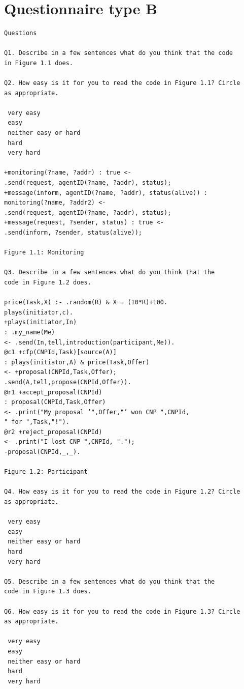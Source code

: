 \documentclass[a4paper,12pt,oneside,fleqn]{book} %
\begin{document}

\chapter{Questionnaire type B}\label{app:SurveyB} %
\begin{verbatim}
Questions

Q1. Describe in a few sentences what do you think that the code
in Figure 1.1 does.

Q2. How easy is it for you to read the code in Figure 1.1? Circle
as appropriate.

 very easy
 easy
 neither easy or hard
 hard
 very hard

+monitoring(?name, ?addr) : true <-
.send(request, agentID(?name, ?addr), status);
+message(inform, agentID(?name, ?addr), status(alive)) :
monitoring(?name, ?addr2) <-
.send(request, agentID(?name, ?addr), status);
+message(request, ?sender, status) : true <-
.send(inform, ?sender, status(alive));

Figure 1.1: Monitoring

Q3. Describe in a few sentences what do you think that the
code in Figure 1.2 does.

price(Task,X) :- .random(R) & X = (10*R)+100.
plays(initiator,c).
+plays(initiator,In)
: .my_name(Me)
<- .send(In,tell,introduction(participant,Me)).
@c1 +cfp(CNPId,Task)[source(A)]
: plays(initiator,A) & price(Task,Offer)
<- +proposal(CNPId,Task,Offer);
.send(A,tell,propose(CNPId,Offer)).
@r1 +accept_proposal(CNPId)
: proposal(CNPId,Task,Offer)
<- .print("My proposal ’",Offer,"’ won CNP ",CNPId,
" for ",Task,"!").
@r2 +reject_proposal(CNPId)
<- .print("I lost CNP ",CNPId, ".");
-proposal(CNPId,_,_).

Figure 1.2: Participant

Q4. How easy is it for you to read the code in Figure 1.2? Circle
as appropriate.

 very easy
 easy
 neither easy or hard
 hard
 very hard

Q5. Describe in a few sentences what do you think that the
code in Figure 1.3 does.

Q6. How easy is it for you to read the code in Figure 1.3? Circle
as appropriate.

 very easy
 easy
 neither easy or hard
 hard
 very hard


\end{verbatim}
\end{document}
